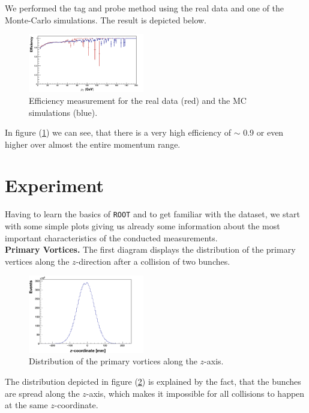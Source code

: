 \documentclass[twocolumn,
			   showpacs,%
               nofootinbib,
               aps,%
               prd,
               notitlepage,
               showkeys,
               10pt]{revtex4-1}
\begin{document}
 We performed the tag and probe method using the real data and one of the Monte-Carlo simulations. The result is depicted below.

\begin{figure}[H]
\centering
\includegraphics[width=0.45\textwidth]{figures/plots/Efficiency_corr}
\caption{Efficiency measurement for the real data (red) and the MC simulations (blue).}
\label{fig:eff}
\end{figure}
In figure (\ref{fig:eff}) we can see, that there is a very high efficiency of $\sim$ 0.9 or even higher over almost the entire momentum range.

\section{Experiment}

Having to learn the basics of \verb|ROOT| and to get familiar with the dataset, we start with some simple plots giving us already some information about the most important characteristics of the conducted measurements.\\

\textbf{Primary Vortices.} The first diagram displays the distribution of the primary vertices along the $z$-direction after a collision of two bunches.
\begin{figure}[H]
\centering
\includegraphics[width = 0.45\textwidth]{figures/plots/DistPrimVort_corr}
\caption{Distribution of the primary vortices along the $z$-axis.}
\label{fig:vortices}
\end{figure}
The distribution depicted in figure (\ref{fig:vortices}) is explained by the fact, that the bunches are spread along the $z$-axis, which makes it impossible for all collisions to happen at the same $z$-coordinate.\\
\end{document}
